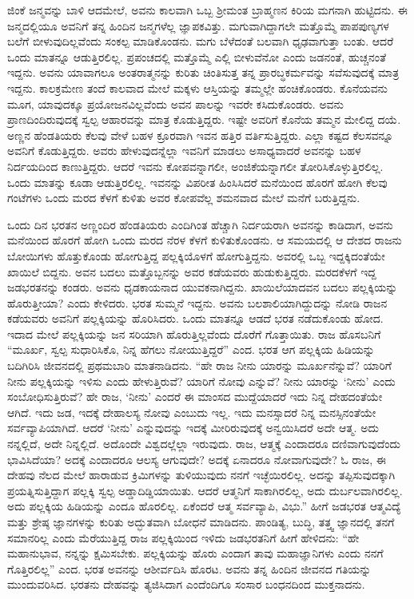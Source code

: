 ಜಿಂಕೆ ಜನ್ಮವನ್ನು ಬಾಳಿ ಆದಮೇಲೆ, ಅವನು ಕಾಲವಾಗಿ ಒಬ್ಬ ಶ‍್ರೀಮಂತ ಬ್ರಾಹ್ಮಣನ ಕಿರಿಯ ಮಗನಾಗಿ ಹುಟ್ಟಿದನು. ಈ ಜನ್ಮದಲ್ಲಿಯೂ ಅವನಿಗೆ ತನ್ನ ಹಿಂದಿನ ಜನ್ಮಗಳೆಲ್ಲ ಜ್ಞಾಪಕವಿತ್ತು. ಮಗುವಾಗಿದ್ದಾಗಲೇ ಮತ್ತೊಮ್ಮೆ ಪಾಪಪುಣ್ಯಗಳ ಬಲೆಗೆ ಬೀಳುವು\-ದಿಲ್ಲವೆಂದು ಸಂಕಲ್ಪ ಮಾಡಿಕೊಂಡನು. ಮಗು ಬೆಳೆದಂತೆ ಬಲವಾಗಿ ಧೃಢವಾಗುತ್ತಾ ಬಂತು. ಆದರೆ ಒಂದು ಮಾತನ್ನೂ ಆಡುತ್ತಿರಲಿಲ್ಲ. ಪ್ರಪಂಚದಲ್ಲಿ ಮತ್ತೊಮ್ಮೆ ಎಲ್ಲಿ ಬೀಳುವೆನೋ ಎಂದು ಜಡನಂತೆ, ಹುಚ್ಚನಂತೆ ಇದ್ದನು. ಅವನು ಯಾವಾಗಲೂ ಅಂತರಾತ್ಮನನ್ನು ಕುರಿತು ಚಿಂತಿಸುತ್ತ ತನ್ನ ಪ್ರಾರಬ್ಧಕರ್ಮವನ್ನು ಸವೆಸುವುದಕ್ಕೆ ಮಾತ್ರ ಇದ್ದನು. ಕಾಲಕ್ರಮೇಣ ತಂದೆ ಕಾಲವಾದ ಮೇಲೆ ಮಕ್ಕಳು ಆಸ್ತಿಯನ್ನು ತಮ್ಮಲ್ಲೇ ಹಂಚಿಕೊಂಡರು. ಕೊನೆಯವನು ಮೂಗ, ಯಾವುದಕ್ಕೂ ಪ್ರಯೋಜನವಿಲ್ಲವೆಂದು ಅವನ ಪಾಲನ್ನು ಇವರೇ ಕಸಿದುಕೊಂಡರು. ಅವನು ಪ್ರಾಣದಿಂದಿರುವುದಕ್ಕೆ ಸ್ವಲ್ಪ ಆಹಾರವನ್ನು ಮಾತ್ರ ಕೊಡು\-ತ್ತಿದ್ದರು. ಇಷ್ಟೇ ಅವರಿಗೆ ಕೊನೆಯ ತಮ್ಮನ ಮೇಲಿದ್ದ ದಯೆ. ಅಣ್ಣನ ಹೆಂಡತಿಯರು ಕೆಲವು ವೇಳೆ ಬಹಳ ಕ್ರೂರವಾಗಿ ಇವನ ಹತ್ತಿರ ವರ್ತಿಸುತ್ತಿದ್ದರು. ಎಲ್ಲಾ ಕಷ್ಟದ ಕೆಲಸವನ್ನೂ ಅವನಿಗೆ ಕೊಡುತ್ತಿದ್ದರು. ಅವರು ಹೇಳುವುದನ್ನೆಲ್ಲಾ ಇವನಿಗೆ ಮಾಡಲು ಅಸಾಧ್ಯವಾದರೆ ಅವನನ್ನು ಬಹಳ ನಿರ್ದಯದಿಂದ ಕಾಣುತ್ತಿದ್ದರು. ಆದರೆ ಇವನು ಕೋಪವನ್ನಾಗಲೀ, ಅಂಜಿಕೆಯನ್ನಾಗಲೀ ತೋರಿಸಿಕೊಳ್ಳುತ್ತಿರಲಿಲ್ಲ. ಒಂದು ಮಾತನ್ನು ಕೂಡಾ ಆಡುತ್ತಿರಲಿಲ್ಲ. ಇವನನ್ನು ವಿಪರೀತ ಹಿಂಸಿಸಿದರೆ ಮನೆಯಿಂದ ಹೊರಗೆ ಹೋಗಿ ಕೆಲವು ಗಂಟೆಗಳು ಒಂದು ಮರದ ಕೆಳಗೆ ಕುಳಿತು ಅವರ ಕೋಪವೆಲ್ಲ ಶಮನವಾದ ಮೇಲೆ ಮನೆಗೆ ಬರುತ್ತಿದ್ದನು.

ಒಂದು ದಿನ ಭರತನ ಅಣ್ಣಂದಿರ ಹೆಂಡತಿಯರು ಎಂದಿಗಿಂತ ಹೆಚ್ಚಾಗಿ ನಿರ್ದಯರಾಗಿ ಅವನನ್ನು ಕಾಡಿದಾಗ, ಅವನು ಮನೆಯಿಂದ ಹೊರಗೆ ಹೋಗಿ ಒಂದು ಮರದ ನೆರಳ ಕೆಳಗೆ ಕುಳಿತುಕೊಂಡನು. ಆ ಸಮಯದಲ್ಲಿ ಆ ದೇಶದ ರಾಜನು ಬೋಯಿಗಳು ಹೊತ್ತುಕೊಂಡು ಹೋಗುತ್ತಿದ್ದ ಪಲ್ಲಕ್ಕಿಯೊಳಗೆ ಹೋಗುತ್ತಿದ್ದನು. ಅವರಲ್ಲಿ ಒಬ್ಬ ಇದ್ದಕ್ಕಿದಂತೆಯೇ ಖಾಯಿಲೆ ಬಿದ್ದನು. ಅವನ ಬದಲು ಮತ್ತೊಬ್ಬನನ್ನು ಅವರ ಕಡೆಯವರು ಹುಡುಕುತ್ತಿದ್ದರು. ಮರದಕೆಳಗೆ ಇದ್ದ ಜಡಭರತನನ್ನು ಕಂಡರು. ಅವನು ಧೃಡಕಾಯನಾದ ಯುವಕನಾಗಿದ್ದನು. ಖಾಯಿಲೆಯಾದವನ ಬದಲು ಪಲ್ಲಕ್ಕಿಯನ್ನು ಹೊರುತ್ತೀಯಾ? ಎಂದು ಕೇಳಿದರು. ಭರತ ಸುಮ್ಮನೆ ಇದ್ದನು. ಅವನು ಬಲಶಾಲಿಯಾಗಿದ್ದುದನ್ನು ನೋಡಿ ರಾಜನ ಕಡೆಯವರು ಅವನಿಗೆ ಪಲ್ಲಕ್ಕಿಯನ್ನು ಹೊರಿಸಿದರು. ಒಂದು ಮಾತನ್ನೂ ಆಡದೆ ಭರತ ನಡೆದುಕೊಂಡು ಹೋದ. ಇದಾದ ಮೇಲೆ ಪಲ್ಲಕ್ಕಿಯನ್ನು ಜನ ಸರಿಯಾಗಿ ಹೊರುತ್ತಿಲ್ಲವೆಂದು ದೊರೆಗೆ ಗೊತ್ತಾಯಿತು. ರಾಜ ಹೊಸಬನಿಗೆ “ಮೂರ್ಖ, ಸ್ವಲ್ಪ ಸುಧಾರಿಸಿಕೊ, ನಿನ್ನ ಹೆಗಲು ನೋಯುತ್ತಿದ್ದರೆ” ಎಂದ. ಭರತ ಆಗ ಪಲ್ಲಕ್ಕಿಯ ಹಿಡಿಯನ್ನು ಬದಿಗಿರಿಸಿ ಜೀವನದಲ್ಲಿ ಪ್ರಥಮಬಾರಿ ಮಾತನಾಡಿದನು. “ಹೇ ರಾಜ ನೀನು ಯಾರನ್ನು ಮೂರ್ಖನೆನ್ನುವೆ? ಯಾರಿಗೆ ನೀನು ಪಲ್ಲಕ್ಕಿಯನ್ನು ಇಳಿಸು ಎಂದು ಹೇಳುತ್ತಿರುವೆ? ಯಾರಿಗೆ ನೋವು ಎನ್ನುವೆ? ನೀನು ಯಾರನ್ನು ‘ನೀನು’ ಎಂದು ಸಂಬೋಧಿಸುತ್ತಿರುವೆ? ಹೇ ರಾಜ, ‘ನೀನು’ ಎಂದರೆ ಈ ಮಾಂಸದ ಮುದ್ದೆಯಾದರೆ ಇದು ನಿನ್ನ ದೇಹದಂತೆಯೇ ಆಗಿದೆ. ಇದು ಜಡ, ಇದಕ್ಕೆ ದೇಹಾಲಸ್ಯ ನೋವು ಎಂಬುದು ಇಲ್ಲ. ಇದು ಮನಸ್ಸಾದರೆ ನಿನ್ನ ಮನಸ್ಸಿನಂತೆಯೇ ಸರ್ವವ್ಯಾಪಿಯಾಗಿದೆ. ಆದರೆ ‘ನೀನು’ ಎನ್ನುವುದನ್ನು ಇದಕ್ಕೆ ಮೀರಿರುವುದಕ್ಕೆ ಅನ್ವಯಿಸಿದರೆ ಅದೇ ಆತ್ಮ. ಅದು ನನ್ನಲ್ಲಿದೆ, ಅದೇ ನಿನ್ನಲ್ಲಿದೆ. ಅದೊಂದೇ ವಿಶ್ವದಲ್ಲೆಲ್ಲಾ ಇರುವುದು. ರಾಜ, ಆತ್ಮಕ್ಕೆ ಎಂದಾದರೂ ದಣಿವಾಗುವುದೆಂದು ಭಾವಿಸಿದೆಯಾ? ಅದಕ್ಕೆ ಎಂದಾದರೂ ಆಲಸ್ಯ ಆಗುವುದೇ? ಅದಕ್ಕೆ ಏನಾದರೂ ನೋವಾಗುವುದೇ? ಓ ರಾಜ, ಈ ದೇಹವು ನೆಲದ ಮೇಲೆ ಹಾರಾಡುವ ಕ್ರಿಮಿಗಳನ್ನು ತುಳಿಯುವುದು ನನಗೆ ಇಚ್ಛೆಯಿರಲಿಲ್ಲ. ಅದನ್ನು ತಪ್ಪಿಸುವುದಕ್ಕಾಗಿ ಪ್ರಯತ್ನಿಸುತ್ತಿದ್ದಾಗ ಪಲ್ಲಕ್ಕಿ ಸ್ವಲ್ಪ ಅಡ್ಡಾದಿಡ್ಡಿಯಾಯಿತು. ಆದರೆ ಆತ್ಮನಿಗೆ ಸಾಕಾಗಿರಲಿಲ್ಲ, ಅದು ದುರ್ಬಲವಾಗಿರಲಿಲ್ಲ. ಅದು ಪಲ್ಲಕ್ಕಿಯ ಹಿಡಿಯನ್ನು ಎಂದೂ ಹೊರಲಿಲ್ಲ. ಏಕೆಂದರೆ ಆತ್ಮ ಸರ್ವವ್ಯಾಪಿ, ವಿಭು.” ಹೀಗೆ ಜಡಭರತ ಆತ್ಮವಿದ್ಯೆ ಮತ್ತು ಶ್ರೇಷ್ಠ ಜ್ಞಾನಗಳನ್ನು ಕುರಿತು ಅದ್ಭುತವಾಗಿ ಬೋಧನೆ ಮಾಡಿದನು. ಪಾಂಡಿತ್ಯ, ಬುದ್ಧಿ, ತತ್ತ್ವ ಜ್ಞಾನದಲ್ಲಿ ತನಗೆ ಸಮಾನರಿಲ್ಲ ಎಂದು ಮೆರೆಯುತ್ತಿದ್ದ ರಾಜ ಪಲ್ಲಕ್ಕಿಯಿಂದ ಇಳಿದು ಜಡಭರತನಿಗೆ ಹೀಗೆ ಹೇಳಿದನು: “ಹೇ ಮಹಾನುಭಾವ, ನನ್ನನ್ನು ಕ್ಷಮಿಸಬೇಕು. ಪಲ್ಲಕ್ಕಿಯನ್ನು ಹೊರು ಎಂದಾಗ ತಾವು ಮಹಾಜ್ಞಾನಿಗಳು ಎಂದು ನನಗೆ ಗೊತ್ತಿರಲಿಲ್ಲ” ಎಂದ. ಭರತ ಅವನನ್ನು ಆಶೀರ್ವದಿಸಿ ಹೊರಟ. ಅವನು ತನ್ನ ಹಿಂದಿನ ಜೀವನದ ಗತಿಯನ್ನು ಮುಂದುವರಿಸಿದ. ಭರತನು ದೇಹವನ್ನು ತ್ಯಜಿಸಿದಾಗ ಎಂದೆಂದಿಗೂ ಸಂಸಾರ ಬಂಧನದಿಂದ ಮುಕ್ತನಾದನು.


